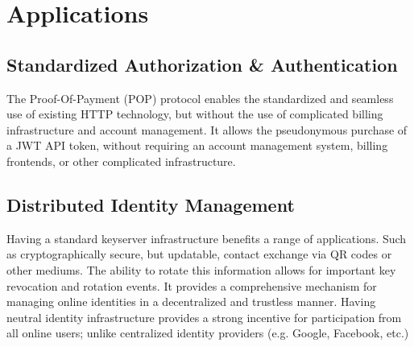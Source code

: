 \documentclass{article}
\begin{document}
\begin{figure}[H]
  \begin{center}
  \end{center}
\end{figure}

\section{Applications}

\subsection{Standardized Authorization \& Authentication}

The Proof-Of-Payment (POP) protocol enables the standardized and seamless use of existing HTTP technology, but without the use of complicated billing infrastructure and account management. It allows the pseudonymous purchase of a JWT\cite{rfc7519} API token, without requiring an account management system, billing frontends, or other complicated infrastructure.

\subsection{Distributed Identity Management}

Having a standard keyserver infrastructure benefits a range of applications. Such as cryptographically secure, but updatable, contact exchange via QR codes or other mediums. The ability to rotate this information allows for important key revocation and rotation events. It provides a comprehensive mechanism for managing online identities in a decentralized and trustless manner. Having neutral identity infrastructure provides a strong incentive for participation from all online users; unlike centralized identity providers (e.g. Google, Facebook, etc.)
\end{document}
